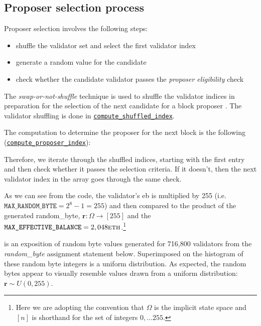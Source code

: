 \documentclass[submission,copyright,creativecommons]{eptcs}
\newcommand{\rb}{\mathbf r}
\begin{document}
\subsection{Proposer selection process}
Proposer selection involves the following steps:
\begin{itemize}[noitemsep]
  \item shuffle the validator set and select the first validator index
  \item generate a random value for the candidate 
  \item check whether the candidate validator passes the \emph{proposer eligibility} check
\end{itemize}

The \emph{swap-or-not-shuffle} technique is used to shuffle the validator
indices in preparation for the selection of the next candidate for a block proposer \cite{hoang2014}. The validator shuffling is done in \href{https://github.com/ethereum/consensus-specs/blob/9c35b7384e78da643f51f9936c578da7d04db698/specs/phase0/beacon-chain.md#compute_shuffled_index}{\texttt{compute\_shuffled\_index}}.

The computation to determine the proposer for the next block is the following (\href{https://github.com/ethereum/consensus-specs/blob/9c35b7384e78da643f51f9936c578da7d04db698/specs/phase0/beacon-chain.md#compute_proposer_index}{\texttt{compute\_proposer\_index}}):



Therefore, we iterate through the shuffled indices, starting with the first
entry and then check whether it passes the selection criteria. If it doesn’t,
then the next validator index in the array goes through the same check.

As we can see from the code, the validator’s \gls{eb} is
multiplied by 255 (i.e.  $\texttt{MAX\_RANDOM\_BYTE} = 2^8 - 1 = 255$) and then
compared to the product of the generated random\_byte, $\rb: \Omega \rightarrow
[255]$ and the $\texttt{MAX\_EFFECTIVE\_BALANCE} = 2,048
\textsc{eth}$.\footnote{Here we are adopting the convention that $\Omega$ is
  the implicit state space and $[n]$ is shorthand for the set of integers $0,
\dots 255$.}
  
 is an exposition of random byte values generated for 716,800
validators from the \emph{random\_byte} assignment statement below.
Superimposed on the histogram of these random byte integers is a uniform
distribution. As expected, the random bytes appear to visually resemble values
drawn from a uniform distribution: $\rb \sim U(0,255)$.
\end{document}
